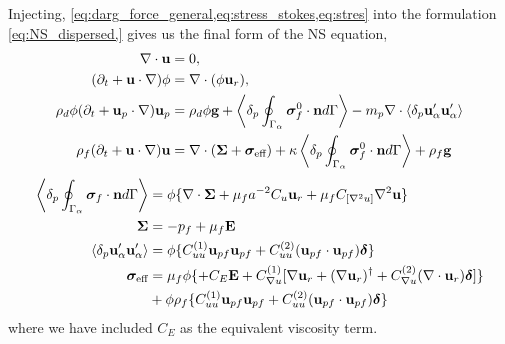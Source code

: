 Injecting, \ref{eq:darg_force_general,eq:stress_stokes,eq:stres} into the formulation \ref{eq:NS_dispersed,} gives us the final form of the NS equation, 
\begin{align}
    \mathbf{\nabla}\cdot\textbf{u}&=0, \\
    (\partial_t + \textbf{u}\cdot \mathbf{\nabla})\phi &= \mathbf{\nabla}\cdot(\phi \textbf{u}_r), \\
    \rho_d\phi (\partial_t + \textbf{u}_p \cdot \mathbf{\nabla})  \textbf{u}_p
    &= 
    \rho_d \phi \textbf{g}
    + 
        \left<\delta_p \oint_{\Gamma_{\alpha}} \bm\sigma_f^0 \cdot \textbf{n} d\Gamma\right>
        - m_p \mathbf{\nabla}\cdot \left<\delta_p \textbf{u}_\alpha'\textbf{u}_\alpha'\right>
    \\
    \rho_f (\partial_t 
    + \textbf{u}\cdot \mathbf{\nabla})
    \textbf{u}
    &= 
    \mathbf{\nabla}\cdot (\bm\Sigma
    +  \bm{\sigma}_\text{eff} )
    + \kappa \left<\delta_p \oint_{\Gamma_{\alpha}}  \bm{\sigma}_f^0 \cdot \textbf{n} d\Gamma\right> 
    + \rho_f \textbf{g} 
\end{align}
\begin{align*}
    \left<\delta_p \oint_{\Gamma_{\alpha}} \bm\sigma_f\cdot \textbf{n} d\Gamma\right> &= 
     \phi \{
    \mathbf{\nabla}\cdot \bm\Sigma
    + 
    \mu_f a^{-2}
    C_u \textbf{u}_{r}
    +\mu_f C_{[\mathbf{\nabla}^2 u]} \mathbf{\nabla}^2 \textbf{u}
    \} 
    \\
    \bm\Sigma &= - p_f + \mu_f \textbf{E}\\
    \left<\delta_p \textbf{u}_\alpha'\textbf{u}_\alpha'\right> &= 
    \phi \{ C_{uu}^{(1)}
    \textbf{u}_{pf}\textbf{u}_{pf} 
    + C_{uu}^{(2)} (\textbf{u}_{pf}\cdot \textbf{u}_{pf}) \bm\delta \}
    \\
    \bm\sigma_\text{eff} &= 
    \mu_f \phi 
    \{ 
    + C_E  \textbf{E}
    +  C_{\mathbf{\nabla} u}^{(1)} [\mathbf{\nabla} \textbf{u}_{r} +(\mathbf{\nabla} \textbf{u}_{r})^\dagger + C_{\mathbf{\nabla} u}^{(2)}(\mathbf{\nabla}\cdot  \textbf{u}_{r})\bm\delta] \}\\
    &+\phi \rho_f \{ C_{uu}^{(1)}
    \textbf{u}_{pf}\textbf{u}_{pf} 
    + C_{uu}^{(2)} (\textbf{u}_{pf}\cdot \textbf{u}_{pf}) \bm\delta \}
\end{align*}
where we have included $C_E$ as the equivalent viscosity term. 



